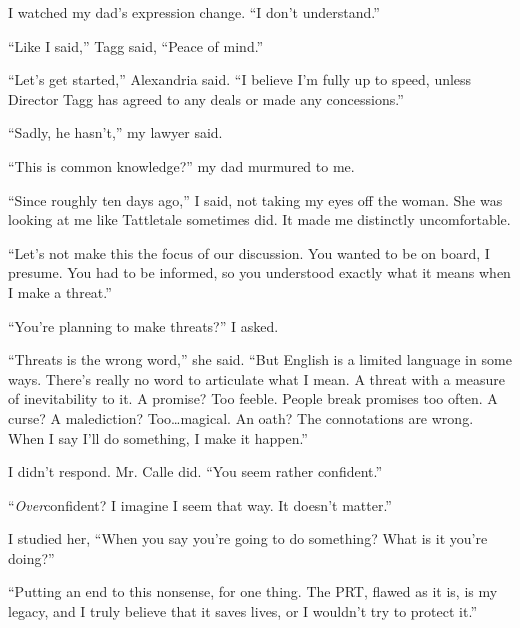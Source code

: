 





I watched my dad's expression change.  ``I don't understand.''



``Like I said,'' Tagg said, ``Peace of mind.''



``Let's get started,'' Alexandria said.  ``I believe I'm fully up to speed, unless Director Tagg has agreed to any deals or made any concessions.''



``Sadly, he hasn't,'' my lawyer said.



``This is common knowledge?'' my dad murmured to me.



``Since roughly ten days ago,'' I said, not taking my eyes off the woman.  She was looking at me like Tattletale sometimes did.  It made me distinctly uncomfortable.



``Let's not make this the focus of our discussion.  You wanted to be on board, I presume.  You had to be informed, so you understood exactly what it means when I make a threat.''



``You're planning to make threats?'' I asked.



``Threats is the wrong word,'' she said.  ``But English is a limited language in some ways.  There's really no word to articulate what I mean.  A threat with a measure of inevitability to it.  A promise?  Too feeble.  People break promises too often.  A curse?  A malediction?  Too\ldots magical.  An oath?  The connotations are wrong.  When I say I'll do something, I make it happen.''



I didn't respond.  Mr. Calle did.  ``You seem rather confident.''



``\emph{Over}confident?  I imagine I seem that way.  It doesn't matter.''



I studied her, ``When you say you're going to do something?  What is it you're doing?''



``Putting an end to this nonsense, for one thing.  The PRT, flawed as it is, is my legacy, and I truly believe that it saves lives, or I wouldn't try to protect it.''



